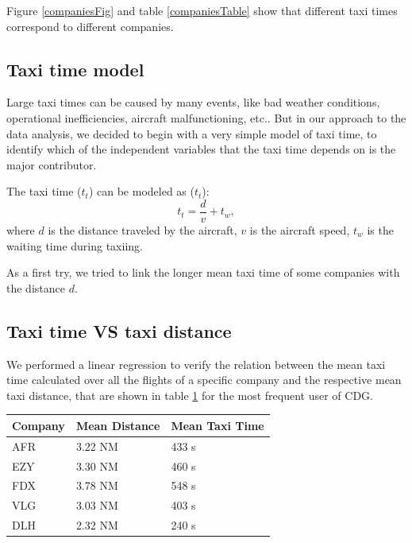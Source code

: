 \documentclass{article}
\begin{document}
Figure \ref{companiesFig} and table \ref{companiesTable} show that different taxi times correspond to different companies.  

\subsection{Taxi time model}

Large taxi times can be caused by many events, like bad weather conditions, operational inefficiencies, aircraft malfunctioning, etc.. But in our approach to the data analysis, we decided to begin with a very simple model of taxi time, to identify which of the independent variables that the taxi time depends on is the major contributor.

The taxi time ($t_t$) can be modeled as ($t_t$):
\begin{equation}\label{time-eq}
t_t = \frac{d}{v} + t_{w}, 
\end{equation}
where $d$ is the distance traveled by the aircraft, $v$ is the aircraft speed, $t_{w}$ is the waiting time during taxiing.

As a first try, we tried to link the longer mean taxi time of some companies with the distance $d$.

\subsection{Taxi time VS taxi distance}\label{regression}
We performed a linear regression to verify the relation between the mean taxi time calculated over all the flights of a specific company and the respective mean taxi distance, that are shown in table \ref{tableDistances} for the most frequent user of CDG.

\begin{table}[h!!!!!!!!!!!!!!!!!!!!!!]
\centering

\begin{tabular}{p{1.5cm}p{1.5cm}p{1.6cm}}\hline
	Company & Mean Distance & Mean Taxi Time\\ \hline
	AFR & 3.22 NM & 433 s \\
	EZY & 3.30 NM & 460 s\\
	FDX & 3.78 NM & 548 s\\ 
	VLG & 3.03 NM & 403 s\\
	DLH & 2.32 NM & 240 s\\
	\hline
\end{tabular}
\label{tableDistances}
\end{table}
\end{document}
